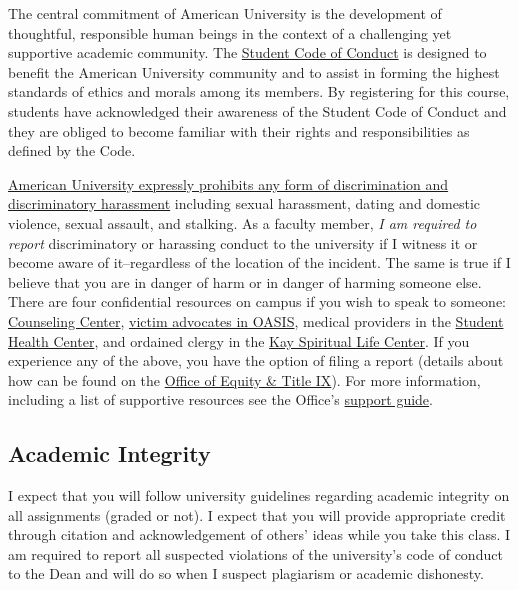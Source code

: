 \documentclass[10pt]{homework}
\begin{document}
The central commitment of American University is the development of thoughtful, responsible human beings in the context of a challenging yet supportive academic community. The \href{https://www.american.edu/policies/students/student-conduct-code.cfm}{Student Code of Conduct} is designed to benefit the American University community and to assist in forming the highest standards of ethics and morals among its members. By registering for this course, students have acknowledged their awareness of the Student Code of Conduct and they are obliged to become familiar with their rights and responsibilities as defined by the Code.

\href{https://www.american.edu/policies/au-community/upload/disrimination-and-sexual-harassment-policy-09-05-19-final.pdf}{American University expressly prohibits any form of discrimination and discriminatory harassment} including sexual harassment, dating and domestic violence, sexual assault, and stalking. As a faculty member, \emph{I am required to report} discriminatory or harassing conduct to the university if I witness it or become aware of it--regardless of the location of the incident. The same is true if I believe that you are in danger of harm or in danger of harming someone else. There are four confidential resources on campus if you wish to speak to someone: \href{https://www.american.edu/ocl/counseling/}{Counseling Center}, \href{https://www.american.edu/ocl/promote-health/oasis.cfm}{victim advocates in OASIS}, medical providers in the \href{https://www.american.edu/ocl/healthcenter/}{Student Health Center}, and ordained clergy in the \href{https://www.american.edu/ocl/kay/}{Kay Spiritual Life Center}. If you experience any of the above, you have the option of filing a report (details about how can be found on the \href{https://www.american.edu/equity-titleix/help.cfm}{Office of Equity \& Title IX}). For more information, including a list of supportive resources see the Office's \href{https://www.american.edu/equity-titleix/support.cfm}{support guide}.


\subsection{Academic Integrity}

I expect that you will follow university guidelines regarding academic integrity on all assignments (graded or not). I expect that you will provide appropriate credit through citation and acknowledgement of others' ideas while you take this class. I am required to report all suspected violations of the university's code of conduct to the Dean and will do so when I suspect plagiarism or academic dishonesty.
\end{document}
